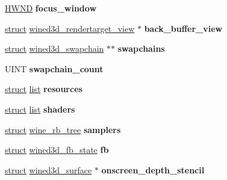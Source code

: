 \begin{DoxyCompactItemize}
\item 
\mbox{\label{structwined3d__device_a689a6e6033f9024fce7fcc4eb029a2c0}} 
\hyperlink{interfacevoid}{H\+W\+ND} {\bfseries focus\+\_\+window}
\item 
\mbox{\label{structwined3d__device_ad21fb53cf8bc051bb88faa424adc8853}} 
\hyperlink{interfacestruct}{struct} \hyperlink{structwined3d__rendertarget__view}{wined3d\+\_\+rendertarget\+\_\+view} $\ast$ {\bfseries back\+\_\+buffer\+\_\+view}
\item 
\mbox{\label{structwined3d__device_abe4cef006cbef3344a49a9523491cdfb}} 
\hyperlink{interfacestruct}{struct} \hyperlink{structwined3d__swapchain}{wined3d\+\_\+swapchain} $\ast$$\ast$ {\bfseries swapchains}
\item 
\mbox{\label{structwined3d__device_a4b8dfac61ce70a54a315e9a68be73f6f}} 
U\+I\+NT {\bfseries swapchain\+\_\+count}
\item 
\mbox{\label{structwined3d__device_aa3ff23793d33422f0615e4d6de69f030}} 
\hyperlink{interfacestruct}{struct} \hyperlink{classlist}{list} {\bfseries resources}
\item 
\mbox{\label{structwined3d__device_a57aa2baf5ea020215204fd71bae248ed}} 
\hyperlink{interfacestruct}{struct} \hyperlink{classlist}{list} {\bfseries shaders}
\item 
\mbox{\label{structwined3d__device_a29b558a5fc6c4b9f1ebdbd43951d64fa}} 
\hyperlink{interfacestruct}{struct} \hyperlink{structwine__rb__tree}{wine\+\_\+rb\+\_\+tree} {\bfseries samplers}
\item 
\mbox{\label{structwined3d__device_a32a6959f0286a6243165cbe5a0465c85}} 
\hyperlink{interfacestruct}{struct} \hyperlink{structwined3d__fb__state}{wined3d\+\_\+fb\+\_\+state} {\bfseries fb}
\item 
\mbox{\label{structwined3d__device_aad09fffd66f89cb4909674993ae12ec2}} 
\hyperlink{interfacestruct}{struct} \hyperlink{structwined3d__surface}{wined3d\+\_\+surface} $\ast$ {\bfseries onscreen\+\_\+depth\+\_\+stencil}
$$
\end{DoxyCompactItemize}
